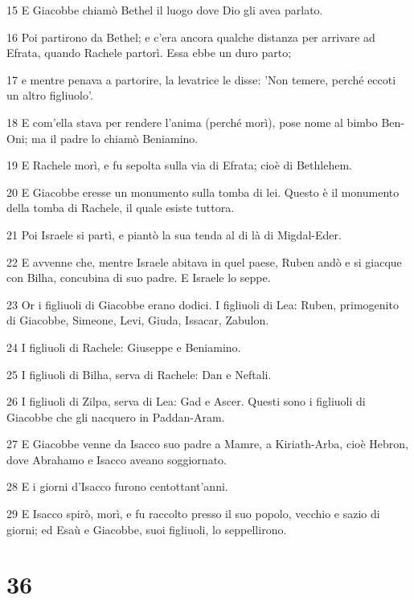 \par 15 E Giacobbe chiamò Bethel il luogo dove Dio gli avea parlato.
\par 16 Poi partirono da Bethel; e c'era ancora qualche distanza per arrivare ad Efrata, quando Rachele partorì. Essa ebbe un duro parto;
\par 17 e mentre penava a partorire, la levatrice le disse: 'Non temere, perché eccoti un altro figliuolo'.
\par 18 E com'ella stava per rendere l'anima (perché morì), pose nome al bimbo Ben-Oni; ma il padre lo chiamò Beniamino.
\par 19 E Rachele morì, e fu sepolta sulla via di Efrata; cioè di Bethlehem.
\par 20 E Giacobbe eresse un monumento sulla tomba di lei. Questo è il monumento della tomba di Rachele, il quale esiste tuttora.
\par 21 Poi Israele si partì, e piantò la sua tenda al di là di Migdal-Eder.
\par 22 E avvenne che, mentre Israele abitava in quel paese, Ruben andò e si giacque con Bilha, concubina di suo padre. E Israele lo seppe.
\par 23 Or i figliuoli di Giacobbe erano dodici. I figliuoli di Lea: Ruben, primogenito di Giacobbe, Simeone, Levi, Giuda, Issacar, Zabulon.
\par 24 I figliuoli di Rachele: Giuseppe e Beniamino.
\par 25 I figliuoli di Bilha, serva di Rachele: Dan e Neftali.
\par 26 I figliuoli di Zilpa, serva di Lea: Gad e Ascer. Questi sono i figliuoli di Giacobbe che gli nacquero in Paddan-Aram.
\par 27 E Giacobbe venne da Isacco suo padre a Mamre, a Kiriath-Arba, cioè Hebron, dove Abrahamo e Isacco aveano soggiornato.
\par 28 E i giorni d'Isacco furono centottant'anni.
\par 29 E Isacco spirò, morì, e fu raccolto presso il suo popolo, vecchio e sazio di giorni; ed Esaù e Giacobbe, suoi figliuoli, lo seppellirono.

\chapter{36}

